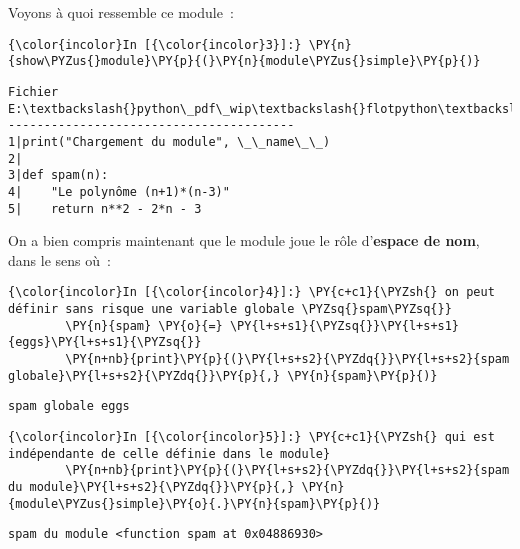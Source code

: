     Voyons à quoi ressemble ce module~:

    \begin{Verbatim}[commandchars=\\\{\}]
{\color{incolor}In [{\color{incolor}3}]:} \PY{n}{show\PYZus{}module}\PY{p}{(}\PY{n}{module\PYZus{}simple}\PY{p}{)}
\end{Verbatim}


    \begin{Verbatim}[commandchars=\\\{\}]
Fichier E:\textbackslash{}python\_pdf\_wip\textbackslash{}flotpython\textbackslash{}w5\textbackslash{}module\_simple.py
----------------------------------------
1|print("Chargement du module", \_\_name\_\_)
2|
3|def spam(n):
4|    "Le polynôme (n+1)*(n-3)"
5|    return n**2 - 2*n - 3

    \end{Verbatim}

    On a bien compris maintenant que le module joue le rôle d'\textbf{espace
de nom}, dans le sens où~:

    \begin{Verbatim}[commandchars=\\\{\}]
{\color{incolor}In [{\color{incolor}4}]:} \PY{c+c1}{\PYZsh{} on peut définir sans risque une variable globale \PYZsq{}spam\PYZsq{}}
        \PY{n}{spam} \PY{o}{=} \PY{l+s+s1}{\PYZsq{}}\PY{l+s+s1}{eggs}\PY{l+s+s1}{\PYZsq{}}
        \PY{n+nb}{print}\PY{p}{(}\PY{l+s+s2}{\PYZdq{}}\PY{l+s+s2}{spam globale}\PY{l+s+s2}{\PYZdq{}}\PY{p}{,} \PY{n}{spam}\PY{p}{)}
\end{Verbatim}


    \begin{Verbatim}[commandchars=\\\{\}]
spam globale eggs

    \end{Verbatim}

    \begin{Verbatim}[commandchars=\\\{\}]
{\color{incolor}In [{\color{incolor}5}]:} \PY{c+c1}{\PYZsh{} qui est indépendante de celle définie dans le module}
        \PY{n+nb}{print}\PY{p}{(}\PY{l+s+s2}{\PYZdq{}}\PY{l+s+s2}{spam du module}\PY{l+s+s2}{\PYZdq{}}\PY{p}{,} \PY{n}{module\PYZus{}simple}\PY{o}{.}\PY{n}{spam}\PY{p}{)}
\end{Verbatim}


    \begin{Verbatim}[commandchars=\\\{\}]
spam du module <function spam at 0x04886930>

    \end{Verbatim}

